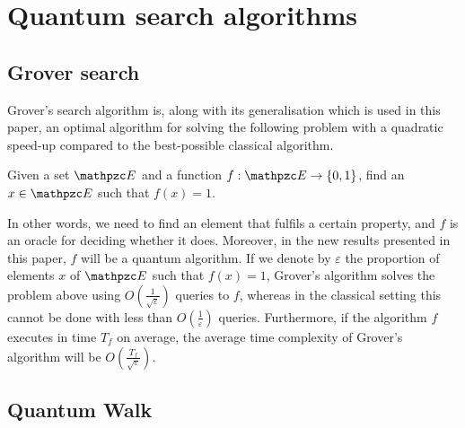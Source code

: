 \section{Quantum search algorithms}
\subsection{Grover search}
Grover's search algorithm \cite{G96a,G97} is, along with its generalisation \cite{BBHT98} which is used in this paper, an optimal algorithm for solving the following problem with a quadratic speed-up compared to the best-possible classical algorithm.
\begin{problem}
Given a set $\zE$ and a function $f : \zE \rightarrow \{0,1\}$, find an $x \in \zE$ such that $f(x) = 1$.
\end{problem}
In other words, we need to find an element that fulfils a certain property, and $f$ is an oracle for deciding whether it does. Moreover, in the new results presented in this paper, $f$ will be a quantum algorithm.
If we denote by $\varepsilon$ the proportion of elements $x$ of $\zE$ such that $f(x) = 1$, Grover's algorithm solves the problem above using $O(\frac{1}{\sqrt{\varepsilon}})$ queries to $f$, whereas in the classical setting this cannot be done with less than $O(\frac{1}{\varepsilon})$ queries.
Furthermore, if the algorithm $f$ executes in time $T_f$ on average, the average time complexity of Grover's algorithm will be $O(\frac{T_f}{\sqrt{\varepsilon}})$.
\subsection{Quantum Walk}
